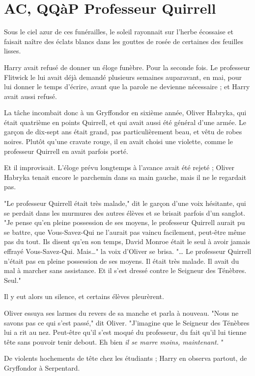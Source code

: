
\chapter{AC, QQàP   Professeur Quirrell}

Sous le ciel azur de ces funérailles, le soleil rayonnait sur l'herbe écossaise et faisait naître des éclats blancs dans les gouttes de rosée de certaines des feuilles lisses.

Harry avait refusé de donner un éloge funèbre. Pour la seconde fois. Le professeur Flitwick le lui avait déjà demandé plusieurs semaines auparavant, en mai, pour lui donner le temps d'écrire, avant que la parole ne devienne nécessaire ; et Harry avait aussi refusé.

La tâche incombait donc à un Gryffondor en sixième année, Oliver Habryka, qui était quatrième en points Quirrell, et qui avait aussi été général d'une armée. Le garçon de dix-sept ans était grand, pas particulièrement beau, et vêtu de robes noires. Plutôt qu'une cravate rouge, il en avait choisi une violette, comme le professeur Quirrell en avait parfois porté.

Et il improvisait. L'éloge prévu longtemps à l'avance avait été rejeté ; Oliver Habryka tenait encore le parchemin dans sa main gauche, mais il ne le regardait pas.

"Le professeur Quirrell était très malade," dit le garçon d'une voix hésitante, qui se perdait dans les murmures des autres élèves et se brisait parfois d'un sanglot. "Je pense qu'en pleine possession de ses moyens, le professeur Quirrell aurait pu se battre, que Vous-Savez-Qui ne l'aurait pas vaincu facilement, peut-être même pas du tout. Ils disent qu'en son temps, David Monroe était le seul à avoir jamais effrayé Vous-Savez-Qui. Mais…" la voix d'Oliver se brisa. "… Le professeur Quirrell n'était pas en pleine possession de ses moyens. Il était très malade. Il avait du mal à marcher sans assistance. Et il s'est dressé contre le Seigneur des Ténèbres. Seul."

Il y eut alors un silence, et certains élèves pleurèrent.

Oliver essuya ses larmes du revers de sa manche et parla à nouveau. "Nous ne savons pas ce qui s'est passé," dit Oliver. "J'imagine que le Seigneur des Ténèbres lui a rit au nez. Peut-être qu'il s'est moqué du professeur, du fait qu'il lui tienne tête sans pouvoir tenir debout. Eh bien \emph{il se marre moins, maintenant.} "

De violents hochements de tête chez les étudiants ; Harry en observa partout, de Gryffondor à Serpentard.

